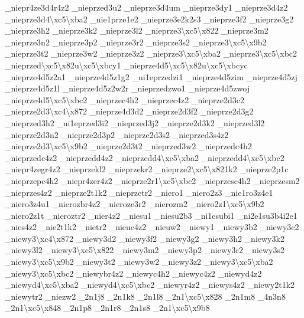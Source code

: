 \begin{DoxyCompactItemize}
\-\_\-niepr4ze3d4r4z2 \-\_\-nieprzed3u2 \-\_\-nieprze3d4um \-\_\-nieprze3dy1 \-\_\-nieprze3d4z2 \-\_\-nieprze3d4\textbackslash{}xc5\textbackslash{}xba2 \-\_\-nie1prze1e2 \-\_\-nieprze3e2k2s3 \-\_\-nieprze3f2 \-\_\-nieprze3g2 \-\_\-nieprze3h2 \-\_\-nieprze3k2 \-\_\-nieprze3l2 \-\_\-nieprze3\textbackslash{}xc5\textbackslash{}x822 \-\_\-nieprze3m2 \-\_\-nieprze3n2 \-\_\-nieprze3p2 \-\_\-nieprze3r2 \-\_\-nieprze3s2 \-\_\-nieprze3\textbackslash{}xc5\textbackslash{}x9b2 \-\_\-nieprze3t2 \-\_\-nieprze3w2 \-\_\-nieprze3z2 \-\_\-nieprze3\textbackslash{}xc5\textbackslash{}xba2 \-\_\-nieprze3\textbackslash{}xc5\textbackslash{}xbc2 \-\_\-nieprzed\textbackslash{}xc5\textbackslash{}x82u\textbackslash{}xc5\textbackslash{}xbcy1 \-\_\-nieprze4d5\textbackslash{}xc5\textbackslash{}x82u\textbackslash{}xc5\textbackslash{}xbcyc \-\_\-nieprze4d5z2a1 \-\_\-nieprze4d5z1g2 \-\_\-ni1eprzedzi1 \-\_\-nieprze4d5zim \-\_\-nieprze4d5zj \-\_\-nieprze4d5z1l \-\_\-nieprze4d5z2w2r \-\_\-nieprzedzwo1 \-\_\-nieprze4d5zwoj \-\_\-nieprze4d5\textbackslash{}xc5\textbackslash{}xbc2 \-\_\-nieprzec4h2 \-\_\-nieprzec4z2 \-\_\-nieprze2d3c2 \-\_\-nieprze2d3\textbackslash{}xc4\textbackslash{}x872 \-\_\-nieprze4d3d2 \-\_\-nieprze2d3f2 \-\_\-nieprze2d3g2 \-\_\-nieprzed3h2 \-\_\-ni1eprzed3i2 \-\_\-nieprzed3j2 \-\_\-nieprze2d3k2 \-\_\-nieprzed3l2 \-\_\-nieprze2d3n2 \-\_\-nieprze2d3p2 \-\_\-nieprze2d3s2 \-\_\-nieprzed3s4z2 \-\_\-nieprze2d3\textbackslash{}xc5\textbackslash{}x9b2 \-\_\-nieprze2d3t2 \-\_\-nieprzed3w2 \-\_\-nieprzedc4h2 \-\_\-nieprzedc4z2 \-\_\-nieprzedd4z2 \-\_\-nieprzedd4\textbackslash{}xc5\textbackslash{}xba2 \-\_\-nieprzedd4\textbackslash{}xc5\textbackslash{}xbc2 \-\_\-niepr4zegr4z2 \-\_\-nieprzekl2 \-\_\-nieprzekr2 \-\_\-nieprze2\textbackslash{}xc5\textbackslash{}x821k2 \-\_\-nieprze2p1c \-\_\-nieprzepc4h2 \-\_\-niepr4zer4z2 \-\_\-nieprze2r1\textbackslash{}xc5\textbackslash{}xbc2 \-\_\-nieprzesc4h2 \-\_\-nieprzesm2 \-\_\-nieprzes4z2 \-\_\-nieprze2t1k2 \-\_\-nieprzetr2 \-\_\-niero1 \-\_\-niero2z3 \-\_\-nie1ro3z4e1 \-\_\-niero3z4u1 \-\_\-nierozbr4z2 \-\_\-nieroze3r2 \-\_\-nierozm2 \-\_\-niero2z1\textbackslash{}xc5\textbackslash{}x9b2 \-\_\-niero2z1t \-\_\-nieroztr2 \-\_\-nier4z2 \-\_\-niesu1 \-\_\-niesu2b3 \-\_\-ni1esubi1 \-\_\-ni2e1su3b4i2e1 \-\_\-nies4z2 \-\_\-nie2t1k2 \-\_\-nietr2 \-\_\-nieuc4z2 \-\_\-nieuw2 \-\_\-niewy1 \-\_\-niewy3b2 \-\_\-niewy3c2 \-\_\-niewy3\textbackslash{}xc4\textbackslash{}x872 \-\_\-niewy3d2 \-\_\-niewy3f2 \-\_\-niewy3g2 \-\_\-niewy3h2 \-\_\-niewy3k2 \-\_\-niewy3l2 \-\_\-niewy3\textbackslash{}xc5\textbackslash{}x822 \-\_\-niewy3m2 \-\_\-niewy3p2 \-\_\-niewy3r2 \-\_\-niewy3s2 \-\_\-niewy3\textbackslash{}xc5\textbackslash{}x9b2 \-\_\-niewy3t2 \-\_\-niewy3w2 \-\_\-niewy3z2 \-\_\-niewy3\textbackslash{}xc5\textbackslash{}xba2 \-\_\-niewy3\textbackslash{}xc5\textbackslash{}xbc2 \-\_\-niewybr4z2 \-\_\-niewyc4h2 \-\_\-niewyc4z2 \-\_\-niewyd4z2 \-\_\-niewyd4\textbackslash{}xc5\textbackslash{}xba2 \-\_\-niewyd4\textbackslash{}xc5\textbackslash{}xbc2 \-\_\-niewyr4z2 \-\_\-niewys4z2 \-\_\-niewy2t1k2 \-\_\-niewytr2 \-\_\-niezw2 \-\_\-2n1j8 \-\_\-2n1k8 \-\_\-2n1l8 \-\_\-2n1\textbackslash{}xc5\textbackslash{}x828 \-\_\-2n1m8 \-\_\-4n3n8 \-\_\-2n1\textbackslash{}xc5\textbackslash{}x848 \-\_\-2n1p8 \-\_\-2n1r8 \-\_\-2n1s8 \-\_\-2n1\textbackslash{}xc5\textbackslash{}x9b8 
\end{DoxyCompactItemize}
